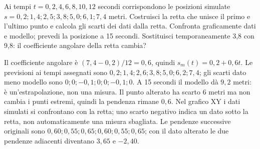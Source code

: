 
\begin{esercizio}
Ai tempi $t=0,2,4,6,8,10,12$ secondi corrispondono le posizioni simulate
$s=0{,}2;1{,}4;2{,}5;3{,}8;5{,}0;6{,}1;7{,}4$ metri.
Costruisci la retta che unisce il primo e l'ultimo punto e calcola gli scarti dei dati dalla retta.
Confronta graficamente dati e modello; prevedi la posizione a 15 secondi.
Sostituisci temporaneamente 3,8 con 9,8: il coefficiente angolare della retta cambia?
\end{esercizio}

\begin{soluzione}
Il coefficiente angolare è $(7{,}4-0{,}2)/12=0{,}6$, quindi $s_m(t)=0{,}2+0{,}6t$.
Le previsioni ai tempi assegnati sono $0{,}2;1{,}4;2{,}6;3{,}8;5{,}0;6{,}2;7{,}4$;
gli scarti dato meno modello sono $0;0;-0{,}1;0;0;-0{,}1;0$.
A 15 secondi il modello dà $9{,}2$ metri: è un'estrapolazione, non una misura.
Il punto alterato ha scarto 6 metri ma non cambia i punti estremi, quindi la pendenza rimane $0{,}6$.
Nel grafico XY i dati simulati si confrontano con la retta; uno scarto negativo
indica un dato sotto la retta, non automaticamente una misura sbagliata.
Le pendenze successive originali sono $0{,}60;0{,}55;0{,}65;0{,}60;0{,}55;0{,}65$;
con il dato alterato le due pendenze adiacenti diventano $3{,}65$ e $-2{,}40$.
\end{soluzione}
